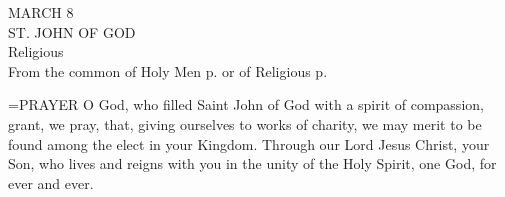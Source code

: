 \begin{center}\normalsize MARCH 8\\
\footnotesize ST. JOHN OF GOD\\
\footnotesize Religious\\
\footnotesize From the common of Holy Men p.    or of Religious p. \\
\end{center}

\hangindent=\parindent \small{PRAYER 
O God, who filled Saint John of God
with a spirit of compassion,
grant, we pray,
that, giving ourselves to works of charity,
we may merit to be found among the elect in your Kingdom.
Through our Lord Jesus Christ, your Son,
who lives and reigns with you in the unity of the Holy Spirit,
one God, for ever and ever.\\}
 
